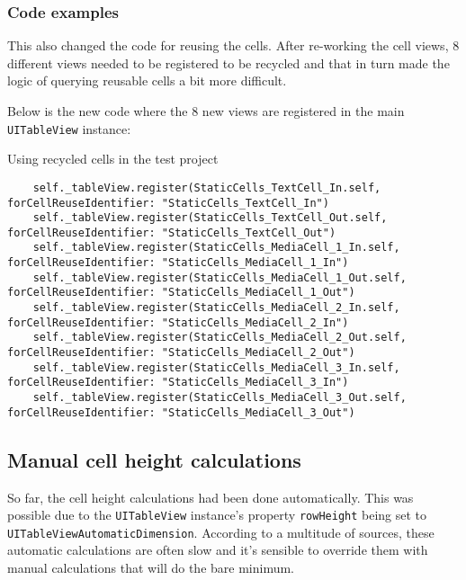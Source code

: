 \documentclass[a4paper,12pt]{article}
\begin{document}
\subsubsection*{Code examples}
This also changed the code for reusing the cells. After re-working the cell views, 8 different views needed to be registered to be recycled and that in turn made the logic of querying reusable cells a bit more difficult.

Below is the new code where the 8 new views are registered in the main \texttt{UITableView} instance:
\begin{listing}[H]
  \caption{Using recycled cells in the test project}
  \begin{verbatim}
    self._tableView.register(StaticCells_TextCell_In.self, forCellReuseIdentifier: "StaticCells_TextCell_In")
    self._tableView.register(StaticCells_TextCell_Out.self, forCellReuseIdentifier: "StaticCells_TextCell_Out")
    self._tableView.register(StaticCells_MediaCell_1_In.self, forCellReuseIdentifier: "StaticCells_MediaCell_1_In")
    self._tableView.register(StaticCells_MediaCell_1_Out.self, forCellReuseIdentifier: "StaticCells_MediaCell_1_Out")
    self._tableView.register(StaticCells_MediaCell_2_In.self, forCellReuseIdentifier: "StaticCells_MediaCell_2_In")
    self._tableView.register(StaticCells_MediaCell_2_Out.self, forCellReuseIdentifier: "StaticCells_MediaCell_2_Out")
    self._tableView.register(StaticCells_MediaCell_3_In.self, forCellReuseIdentifier: "StaticCells_MediaCell_3_In")
    self._tableView.register(StaticCells_MediaCell_3_Out.self, forCellReuseIdentifier: "StaticCells_MediaCell_3_Out")
  \end{verbatim}
\end{listing}

\subsection{Manual cell height calculations}\label{subsection:ManualCellHeightCalculations}
So far, the cell height calculations had been done automatically. This was possible due to the \texttt{UITableView} instance's property \texttt{rowHeight} being set to \texttt{UITableViewAutomaticDimension}. According to a multitude of sources, these automatic calculations are often slow and it's sensible to override them with manual calculations that will do the bare minimum.\cite{PerfectSmoothScrollingInUITableViews}\cite{HowToMakeDynamicTableViewCellHeight}
\end{document}
